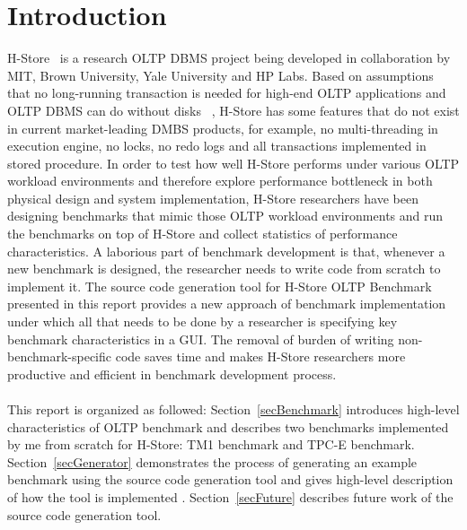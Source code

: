 \documentclass[a4paper,10pt]{article}
\title{\system}
\author{
        Zhe Zhang \\
        zhe@cs.brown.edu\\\\
        Department of Computer Science, Brown University
}
\date{}
\begin{document}
\maketitle

\doublespacing

\section{Introduction}
H-Store~\cite{hstore} is a research OLTP DBMS project being developed in collaboration by MIT, Brown University, Yale University and HP Labs.  Based on assumptions that no long-running transaction is needed for high-end OLTP applications and OLTP DBMS can do without disks~\cite{citeulike:2326978} , H-Store has some features that do not exist in current market-leading DMBS products, for example, no multi-threading in execution engine, no locks, no redo logs and all transactions implemented in stored procedure. In order to test how well H-Store performs under various OLTP workload environments and therefore explore performance bottleneck in both physical design and system implementation, H-Store researchers have been designing benchmarks that mimic those OLTP workload environments and run the benchmarks on top of H-Store and collect statistics of performance characteristics. A laborious part of benchmark development is that, whenever a new benchmark is designed, the researcher needs to write code from scratch to implement it. The source code generation tool for H-Store OLTP Benchmark presented in this report provides a new approach of benchmark implementation under which all that needs to be done by a researcher is specifying key benchmark characteristics in a GUI. The removal of burden of writing non-benchmark-specific code saves time and makes H-Store researchers more productive and efficient in benchmark development process.
\\\\
This report is organized as followed: Section~\ref{secBenchmark} introduces high-level characteristics of OLTP benchmark and describes two benchmarks implemented by me from scratch for H-Store: TM1 benchmark and TPC-E benchmark. Section~\ref{secGenerator} demonstrates the process of generating an example benchmark using the source code generation tool and gives high-level description of how the tool is implemented . Section~\ref{secFuture} describes future work of the source code generation tool.
\end{document}
